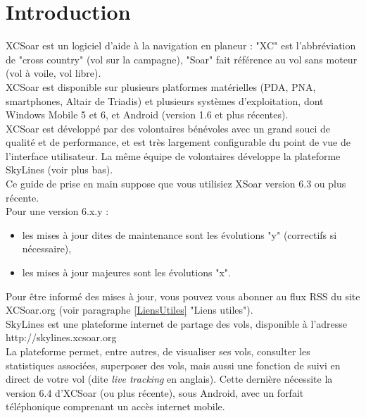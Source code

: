 \documentclass{article}
\begin{document}
\section{Introduction}
\noindent
XCSoar est un logiciel d'aide à la navigation en planeur : "XC" est l'abbréviation de "cross country" (vol sur la campagne), "Soar" fait référence au vol sans moteur (vol à voile, vol libre).\\
%
\newline
%
XCSoar est disponible sur plusieurs platformes matérielles (PDA, PNA, smartphones, Altair de Triadis) et plusieurs systèmes d'exploitation, dont Windows Mobile 5 et 6, et Android (version 1.6 et plus récentes).\\
%
\newline
%
XCSoar est développé par des volontaires bénévoles avec un grand souci de qualité et de performance, et est très largement configurable du point de vue de l'interface utilisateur. La même équipe de volontaires développe la plateforme SkyLines (voir plus bas).\\
Ce guide de prise en main suppose que vous utilisiez XSoar version 6.3 ou plus récente.\\
Pour une version 6.x.y :
\begin{itemize}
\item les mises à jour dites de maintenance sont les évolutions "y" (correctifs si nécessaire),
\item les mises à jour majeures sont les évolutions "x".
\end{itemize}
%
Pour être informé des mises à jour, vous pouvez vous abonner au flux RSS du site XCSoar.org (voir paragraphe \ref{LiensUtiles} "Liens utiles").\\
%
\newline
SkyLines est une plateforme internet de partage des vols, disponible à l'adresse http://skylines.xcsoar.org\\
La plateforme permet, entre autres, de visualiser ses vols, consulter les statistiques associées, superposer des vols, mais aussi une fonction de suivi en direct de votre vol (dite \textit{live tracking} en anglais). Cette dernière nécessite la version 6.4 d'XCSoar (ou plus récente), sous Android, avec un forfait téléphonique comprenant un accès internet mobile.\\
%
\end{document}

